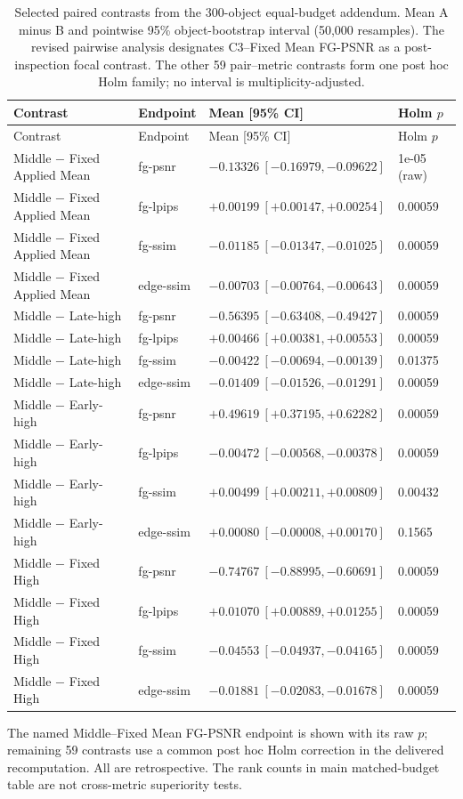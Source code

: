 \documentclass[11pt]{article}
\begin{document}
\begingroup\scriptsize
\begin{longtable}{llll}
\caption{Selected paired contrasts from the 300-object equal-budget addendum. Mean A minus B and pointwise 95\% object-bootstrap interval (50,000 resamples). The revised pairwise analysis designates C3--Fixed Mean FG-PSNR as a post-inspection focal contrast. The other 59 pair--metric contrasts form one post hoc Holm family; no interval is multiplicity-adjusted.}\label{tab:budget300paired}\\
\toprule Contrast & Endpoint & Mean [95\% CI] & Holm $p$ \\
\midrule\endfirsthead
\toprule Contrast & Endpoint & Mean [95\% CI] & Holm $p$ \\
\midrule\endhead
Middle $-$ Fixed Applied Mean & fg-psnr & $-0.13326\ [-0.16979,-0.09622]$ & 1e-05 (raw) \\
Middle $-$ Fixed Applied Mean & fg-lpips & $+0.00199\ [+0.00147,+0.00254]$ & 0.00059 \\
Middle $-$ Fixed Applied Mean & fg-ssim & $-0.01185\ [-0.01347,-0.01025]$ & 0.00059 \\
Middle $-$ Fixed Applied Mean & edge-ssim & $-0.00703\ [-0.00764,-0.00643]$ & 0.00059 \\
Middle $-$ Late-high & fg-psnr & $-0.56395\ [-0.63408,-0.49427]$ & 0.00059 \\
Middle $-$ Late-high & fg-lpips & $+0.00466\ [+0.00381,+0.00553]$ & 0.00059 \\
Middle $-$ Late-high & fg-ssim & $-0.00422\ [-0.00694,-0.00139]$ & 0.01375 \\
Middle $-$ Late-high & edge-ssim & $-0.01409\ [-0.01526,-0.01291]$ & 0.00059 \\
Middle $-$ Early-high & fg-psnr & $+0.49619\ [+0.37195,+0.62282]$ & 0.00059 \\
Middle $-$ Early-high & fg-lpips & $-0.00472\ [-0.00568,-0.00378]$ & 0.00059 \\
Middle $-$ Early-high & fg-ssim & $+0.00499\ [+0.00211,+0.00809]$ & 0.00432 \\
Middle $-$ Early-high & edge-ssim & $+0.00080\ [-0.00008,+0.00170]$ & 0.1565 \\
Middle $-$ Fixed High & fg-psnr & $-0.74767\ [-0.88995,-0.60691]$ & 0.00059 \\
Middle $-$ Fixed High & fg-lpips & $+0.01070\ [+0.00889,+0.01255]$ & 0.00059 \\
Middle $-$ Fixed High & fg-ssim & $-0.04553\ [-0.04937,-0.04165]$ & 0.00059 \\
Middle $-$ Fixed High & edge-ssim & $-0.01881\ [-0.02083,-0.01678]$ & 0.00059 \\
\bottomrule
\end{longtable}\endgroup
The named Middle--Fixed Mean FG-PSNR endpoint is shown with its raw $p$; remaining 59 contrasts use a common post hoc Holm correction in the delivered recomputation. All are retrospective. The rank counts in main matched-budget table are not cross-metric superiority tests.
\end{document}
